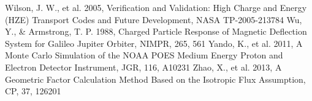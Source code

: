 \documentclass{jkas}
\begin{document}
\begin{thebibliography}{}
 Wilson, J. W., et al. 2005, Verification and Validation: High Charge and Energy (HZE) Transport Codes and Future Development, NASA TP-2005-213784
 Wu, Y., \& Armstrong, T. P. 1988, Charged Particle Response of Magnetic Deflection System for Galileo Jupiter Orbiter, NIMPR, 265, 561
 Yando, K., et al. 2011, A Monte Carlo Simulation of the NOAA POES Medium Energy Proton and Electron Detector Instrument, JGR, 116, A10231
 Zhao, X., et al. 2013, A Geometric Factor Calculation Method Based on the Isotropic Flux Assumption, CP, 37, 126201



\end{thebibliography}
\end{document}
